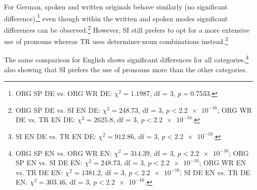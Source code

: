 \documentclass[output=paper,colorlinks,citecolor=brown]{langscibook}
\begin{document}
For German, spoken and written originals behave similarly (no significant difference),\footnote{ORG SP DE vs. ORG WR DE: $\chi^2 = 1.1987$, df = 3, $p = 0.7533$.} even though within the written and spoken modes significant differences can be observed.\footnote{ORG SP DE vs. SI EN DE: $\chi^2 = 248.73$, df = 3, $p < \num{2.2e-16}$; ORG WR DE vs. TR EN DE: $\chi^2 = 2625.8$, df = 3, $p < \num{2.2e-16}$.} However, SI still prefers to opt for a more extensive use of pronouns whereas TR uses determiner-noun combinations instead.\footnote{SI EN DE vs. TR EN DE: $\chi^2 = 912.86$, df = 3, $p < \num{2.2e-16}$.}

The same comparison for English shows significant differences for all categories,\footnote{ORG SP EN vs. ORG WR EN: $\chi^2 = 314.39$, df = 3, $p < \num{2.2e-16}$; ORG SP EN vs. SI DE EN: $\chi^2 = 248.73$, df = 3, $p < \num{2.2e-16}$; ORG WR EN vs. TR DE EN: $\chi^2 = 1381.2$, df = 3, $p < \num{2.2e-16}$; SI DE EN vs. TR DE EN: $\chi^2 =303.46$, df = 3, $p < \num{2.2e-16}$.} also showing that SI prefers the use of pronouns more than the other categories. 
\end{document}
